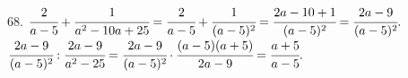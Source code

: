 68. $\cfrac{2}{a-5}+\cfrac{1}{a^2-10a+25}=\cfrac{2}{a-5}+\cfrac{1}{(a-5)^2}=\cfrac{2a-10+1}{(a-5)^2}=\cfrac{2a-9}{(a-5)^2}.$\\
$\cfrac{2a-9}{(a-5)^2}:\cfrac{2a-9}{a^2-25}=\cfrac{2a-9}{(a-5)^2}\cdot\cfrac{(a-5)(a+5)}{2a-9}=\cfrac{a+5}{a-5}.$\\
